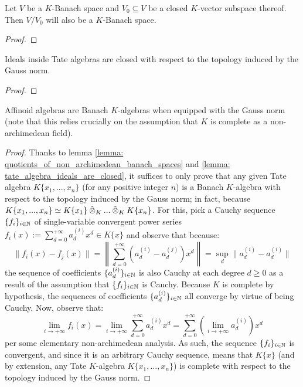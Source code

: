             \begin{lemma} \label{lemma: quotients_of_non_archimedean_banach_spaces}
                Let $V$ be a $K$-Banach space and $V_0 \subseteq V$ be a closed $K$-vector subspace thereof. Then $V/V_0$ will also be a $K$-Banach space. 
            \end{lemma}
                \begin{proof}
                    
                \end{proof}
            \begin{lemma} \label{lemma: tate_algebra_ideals_are_closed}
                Ideals inside Tate algebras are closed with respect to the topology induced by the Gauss norm.
            \end{lemma}
                \begin{proof}
                    
                \end{proof}
            \begin{proposition} \label{prop: affinoid_algebras_are_banach_algebras}
                Affinoid algebras are Banach $K$-algebras when equipped with the Gauss norm (note that this relies crucially on the assumption that $K$ is complete as a non-archimedean field).
            \end{proposition}
                \begin{proof}
                    Thanks to lemma \ref{lemma: quotients_of_non_archimedean_banach_spaces} and \ref{lemma: tate_algebra_ideals_are_closed}, it suffices to only prove that any given Tate algebra $K\{x_1, ..., x_n\}$ (for any positive integer $n$) is a Banach $K$-algebra with respect to the topology induced by the Gauss norm; in fact, because $K\{x_1, ..., x_n\} \cong K\{x_1\} \hattensor_K ... \hattensor_K K\{x_n\}$. For this, pick a Cauchy sequence $\{f_i\}_{i \in \mathbb{N}}$ of single-variable convergent power series $f_i(x) := \sum_{d = 0}^{+\infty} a_d^{(i)} x^d \in K\{x\}$ and observe that because:
                        $$\|f_i(x) - f_j(x)\| = \left\| \sum_{d = 0}^{+\infty} (a_d^{(i)} - a_d^{(j)}) x^d \right\| = \sup_d \|a_d^{(i)} - a_d^{(i)}\|$$
                    the sequence of coefficients $\{a_d^{(i)}\}_{i \in \mathbb{N}}$ is also Cauchy at each degree $d \geq 0$ as a result of the assumption that $\{f_i\}_{i \in \mathbb{N}}$ is Cauchy. Because $K$ is complete by hypothesis, the sequences of coefficients $\{a_d^{(i)}\}_{i \in \mathbb{N}}$ all converge by virtue of being Cauchy. Now, observe that:
                        $$\underset{i \to +\infty}{\lim} f_i(x) = \underset{i \to +\infty}{\lim} \sum_{d = 0}^{+\infty} a_d^{(i)} x^d = \sum_{d = 0}^{+\infty} \left( \underset{i \to +\infty}{\lim} a_d^{(i)} \right) x^d$$
                    per some elementary non-archimedean analysis. As such, the sequence $\{f_i\}_{i \in \mathbb{N}}$ is convergent, and since it is an arbitrary Cauchy sequence, means that $K\{x\}$ (and by extension, any Tate $K$-algebra $K\{x_1, ..., x_n\}$) is complete with respect to the topology induced by the Gauss norm. 
                \end{proof}
